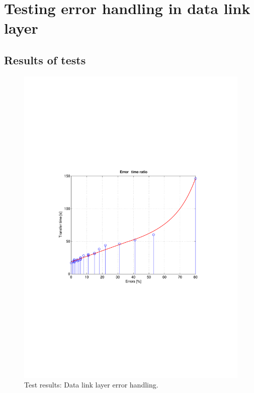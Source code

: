 \section{Testing error handling in data link layer}\label{app:exp:dll_result}


\subsection{Results of tests}
\begin{figure}[htb]
 \centering
 \includegraphics[scale=0.8,trim=50 260 0 260]{content/graphics/test_graph.pdf}%
 \caption{Test results: Data link layer error handling.}
 \label{fig:test_graph}
\end{figure}


